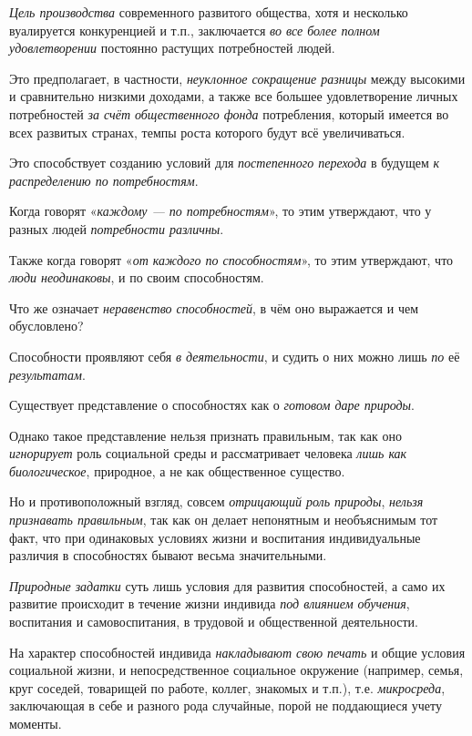 \documentclass[a4paper,14pt,russian]{extreport}
\begin{document}
\emph{Цель производства} современного развитого общества, хотя и несколько вуалируется конкуренцией и т.п., заключается \emph{во все более полном удовлетворении} постоянно растущих потребностей людей.

Это предполагает, в частности, \emph{неуклонное сокращение разницы} между высокими и сравнительно низкими доходами, а также все большее удовлетворение личных потребностей \emph{за счёт общественного фонда} потребления, который имеется во всех развитых странах, темпы роста которого будут всё увеличиваться.

Это способствует созданию условий для \emph{постепенного перехода} в будущем \emph{к распределению по потребностям}.

Когда говорят «\emph{каждому --- по потребностям}», то этим утверждают, что у разных людей \emph{потребности различны}.

Также когда говорят «\emph{от каждого по способностям}», то этим утверждают, что \emph{люди неодинаковы}, и по своим способностям.

Что же означает \emph{неравенство способностей}, в чём оно выражается и чем обусловлено?

Способности проявляют себя \emph{в деятельности}, и судить о них можно лишь \emph{по} её \emph{результатам}.

Существует представление о способностях как о \emph{готовом даре природы}.

Однако такое представление нельзя признать правильным, так как оно \emph{игнорирует} роль социальной среды и рассматривает человека \emph{лишь как биологическое}, природное, а не как общественное существо.

Но и противоположный взгляд, совсем \emph{отрицающий роль природы}, \emph{нельзя признавать правильным}, так как он делает непонятным и необъяснимым тот факт, что при одинаковых условиях жизни и воспитания индивидуальные различия в способностях бывают весьма значительными.

\emph{Природные задатки} суть лишь условия для развития способностей, а само их развитие происходит в течение жизни индивида \emph{под влиянием обучения}, воспитания и самовоспитания, в трудовой и общественной деятельности.

На характер способностей индивида \emph{накладывают свою печать} и общие условия социальной жизни, и непосредственное социальное окружение (например, семья, круг соседей, товарищей по работе, коллег, знакомых и т.п.), т.е. \emph{микросреда}, заключающая в себе и разного рода случайные, порой не поддающиеся учету моменты.
\end{document}
